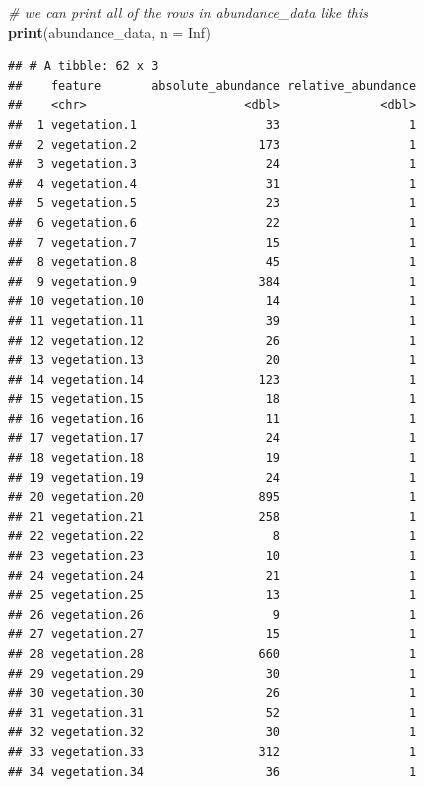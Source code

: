 \documentclass[12pt,]{book}
\newenvironment{Shaded}{\begin{snugshade}}{\end{snugshade}}
\newcommand{\KeywordTok}[1]{\textcolor[rgb]{0.13,0.29,0.53}{\textbf{#1}}}
\newcommand{\DataTypeTok}[1]{\textcolor[rgb]{0.13,0.29,0.53}{#1}}
\newcommand{\CommentTok}[1]{\textcolor[rgb]{0.56,0.35,0.01}{\textit{#1}}}
\newcommand{\OtherTok}[1]{\textcolor[rgb]{0.56,0.35,0.01}{#1}}
\newcommand{\NormalTok}[1]{#1}
\begin{document}
\begin{Shaded}
\begin{Highlighting}[]
\CommentTok{# we can print all of the rows in abundance_data like this}
\KeywordTok{print}\NormalTok{(abundance_data, }\DataTypeTok{n =} \OtherTok{Inf}\NormalTok{)}
\end{Highlighting}
\end{Shaded}

\begin{verbatim}
## # A tibble: 62 x 3
##    feature       absolute_abundance relative_abundance
##    <chr>                      <dbl>              <dbl>
##  1 vegetation.1                  33                  1
##  2 vegetation.2                 173                  1
##  3 vegetation.3                  24                  1
##  4 vegetation.4                  31                  1
##  5 vegetation.5                  23                  1
##  6 vegetation.6                  22                  1
##  7 vegetation.7                  15                  1
##  8 vegetation.8                  45                  1
##  9 vegetation.9                 384                  1
## 10 vegetation.10                 14                  1
## 11 vegetation.11                 39                  1
## 12 vegetation.12                 26                  1
## 13 vegetation.13                 20                  1
## 14 vegetation.14                123                  1
## 15 vegetation.15                 18                  1
## 16 vegetation.16                 11                  1
## 17 vegetation.17                 24                  1
## 18 vegetation.18                 19                  1
## 19 vegetation.19                 24                  1
## 20 vegetation.20                895                  1
## 21 vegetation.21                258                  1
## 22 vegetation.22                  8                  1
## 23 vegetation.23                 10                  1
## 24 vegetation.24                 21                  1
## 25 vegetation.25                 13                  1
## 26 vegetation.26                  9                  1
## 27 vegetation.27                 15                  1
## 28 vegetation.28                660                  1
## 29 vegetation.29                 30                  1
## 30 vegetation.30                 26                  1
## 31 vegetation.31                 52                  1
## 32 vegetation.32                 30                  1
## 33 vegetation.33                312                  1
## 34 vegetation.34                 36                  1

\end{verbatim}
\end{document}
